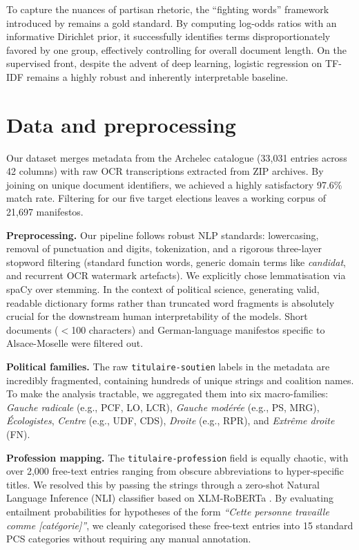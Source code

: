 \documentclass{article}
\begin{document}
To capture the nuances of partisan rhetoric, the ``fighting words'' framework introduced by \citet{monroe2008fightin} remains a gold standard. By computing log-odds ratios with an informative Dirichlet prior, it successfully identifies terms disproportionately favored by one group, effectively controlling for overall document length. On the supervised front, despite the advent of deep learning, logistic regression on TF-IDF remains a highly robust and inherently interpretable baseline.

\section{Data and preprocessing}
\label{sec:data}

Our dataset merges metadata from the Archelec catalogue (33,031 entries across 42 columns) with raw OCR transcriptions extracted from ZIP archives. By joining on unique document identifiers, we achieved a highly satisfactory 97.6\% match rate. Filtering for our five target elections leaves a working corpus of 21,697 manifestos.

\textbf{Preprocessing.} Our pipeline follows robust NLP standards: lowercasing, removal of punctuation and digits, tokenization, and a rigorous three-layer stopword filtering (standard function words, generic domain terms like \textit{candidat}, and recurrent OCR watermark artefacts). We explicitly chose lemmatisation via spaCy over stemming. In the context of political science, generating valid, readable dictionary forms rather than truncated word fragments is absolutely crucial for the downstream human interpretability of the models. Short documents ($<$100 characters) and German-language manifestos specific to Alsace-Moselle were filtered out.

\textbf{Political families.} The raw \texttt{titulaire-soutien} labels in the metadata are incredibly fragmented, containing hundreds of unique strings and coalition names. To make the analysis tractable, we aggregated them into six macro-families: \textit{Gauche radicale} (e.g., PCF, LO, LCR), \textit{Gauche modérée} (e.g., PS, MRG), \textit{Écologistes}, \textit{Centre} (e.g., UDF, CDS), \textit{Droite} (e.g., RPR), and \textit{Extrême droite} (FN).

\textbf{Profession mapping.} The \texttt{titulaire-profession} field is equally chaotic, with over 2,000 free-text entries ranging from obscure abbreviations to hyper-specific titles. We resolved this by passing the strings through a zero-shot Natural Language Inference (NLI) classifier based on XLM-RoBERTa \citep{conneau2020unsupervised}. By evaluating entailment probabilities for hypotheses of the form \textit{``Cette personne travaille comme [catégorie]''}, we cleanly categorised these free-text entries into 15 standard PCS categories without requiring any manual annotation.
\end{document}
